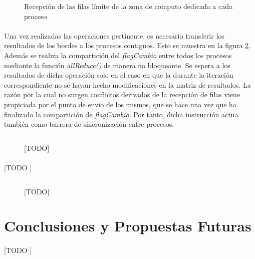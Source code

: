 \documentclass[10pt, a4paper,spanish]{article}
\begin{document}
		\begin{figure}[H]
			\centering
			\inputminted{c}{./code/op3.c}
			\caption{Recepción de las filas límite de la zona de computo dedicada a cada proceso}
			\label{code:op3}
		\end{figure}

		\paragraph{}
		Una vez realizadas las operaciones pertinente, es necesario transferir los resultados de los bordes a los procesos contiguos. Esto se muestra en la figura \ref{code:op4}. Además se realiza la compartición del \emph{flagCambio} entre todos los procesos mediante la función \emph{allReduce()} de manera no bloqueante. Se espera a los resultados de dicha operación solo en el caso en que la durante la iteración correspondiente no se hayan hecho modificaciones en la matriz de resultados. La razón por la cual no surgen conflictos derivados de la recepción de filas viene propiciada por el punto de envio de los mismos, que se hace una vez que ha finalizado la compartición de \emph{flagCambio}. Por tanto, dicha instrucción actua también como barrera de sincronización entre procesos.

		\begin{figure}[H]
			\centering
			\inputminted{c}{./code/op4.c}
			\caption{[TODO]}
			\label{code:op4}
		\end{figure}

		\paragraph{}
		[TODO ]

		\begin{figure}[H]
			\centering
			\inputminted{c}{./code/op5.c}
			\caption{[TODO]}
			\label{code:op5}
		\end{figure}


	\section{Conclusiones y Propuestas Futuras}

		\paragraph{}
		[TODO ]

	\nocite{subject:cp}
  
  
\end{document}
